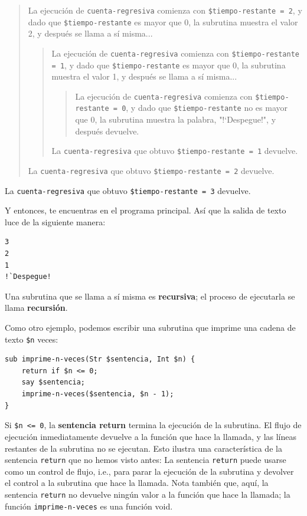 \begin{quote}
La ejecución de {\tt cuenta-regresiva} comienza con 
{\tt \$tiempo-restante = 2}, y dado que {\tt \$tiempo-restante}
es mayor que 0, la subrutina muestra el valor 2, y después
se llama a sí misma...

\begin{quote}
La ejecución de {\tt cuenta-regresiva} comienza con 
{\tt \$tiempo-restante = 1}, y dado que {\tt \$tiempo-restante}
es mayor que 0, la subrutina muestra el valor 1, y después
se llama a sí misma...

\begin{quote}
La ejecución de {\tt cuenta-regresiva} comienza con 
{\tt \$tiempo-restante = 0}, y dado que {\tt \$tiempo-restante}
no es mayor que 0, la subrutina muestra la palabra, "!`Despegue!",
y después devuelve.
\end{quote}

La {\tt cuenta-regresiva} que obtuvo {\tt \$tiempo-restante = 1} devuelve.
\end{quote}


La {\tt cuenta-regresiva} que obtuvo {\tt \$tiempo-restante = 2} devuelve.
\end{quote}


La {\tt cuenta-regresiva} que obtuvo {\tt \$tiempo-restante = 3} devuelve.

Y entonces, te encuentras en el programa principal. Así que la
salida de texto luce de la siguiente manera:

\begin{lstlisting}
3
2
1
!`Despegue!
\end{lstlisting}
%
Una subrutina que se llama a sí misma es {\bf recursiva};
el proceso de ejecutarla se llama {\bf recursión}.

Como otro ejemplo, podemos escribir una subrutina que 
imprime una cadena de texto {\tt \$n} veces:

\begin{lstlisting}
sub imprime-n-veces(Str $sentencia, Int $n) {
    return if $n <= 0;
    say $sentencia;
    imprime-n-veces($sentencia, $n - 1);
}
\end{lstlisting}
%
Si {\tt \$n <= 0}, la {\bf sentencia return} termina la ejecución 
de la subrutina. El flujo de ejecución inmediatamente devuelve
a la función que hace la llamada, y las líneas restantes de la
subrutina no se ejecutan. Esto ilustra una característica de la 
sentencia {\tt return} que no hemos visto antes: La sentencia
{\tt return} puede usarse como un control de flujo, i.e., para 
parar la ejecución de la subrutina y devolver el control
a la subrutina que hace la llamada. Nota también que, aquí,
la sentencia {\tt return} no devuelve ningún valor a la función
que hace la llamada; la función {\tt imprime-n-veces} es una
función void.

